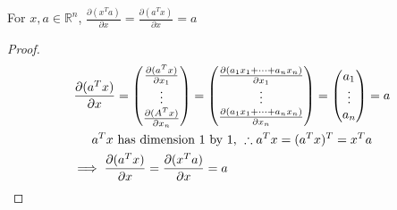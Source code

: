 \begin{lemma} \label{lemma2}
	For \(x,a \in \mathbb{R}^n \),
	\(\frac{\partial (x^T a)}{\partial x} = \frac{\partial (a^T x)}{\partial x} = a\)  
\end{lemma}
\begin{proof}
	\begin{multline*}
	\frac{\partial (a^T x)}{\partial x}  = \begin{pmatrix}
	\frac{\partial (a^T x)}{\partial x_1} \\
	\vdots \\
	\frac{\partial (A^T x)}{\partial x_n}
	\end{pmatrix} = \begin{pmatrix}
	\frac{\partial (a_1 x_1 + \dots + a_n x_n)}{\partial x_1} \\
	\vdots \\
	\frac{\partial (a_1 x_1 + \dots + a_n x_n)}{\partial x_n}
	\end{pmatrix}
	= \begin{pmatrix}
	a_1 \\
	\vdots \\
	a_n
	\end{pmatrix}
	= a \\
	a^T x \text{ has dimension 1 by 1, } \therefore a^T x = (a^T x)^T = x^T a \\
	\implies \frac{\partial (a^T x)}{\partial x} = \frac{\partial (x^T a)}{\partial x} = a \hfill
	\end{multline*}
\end{proof}

